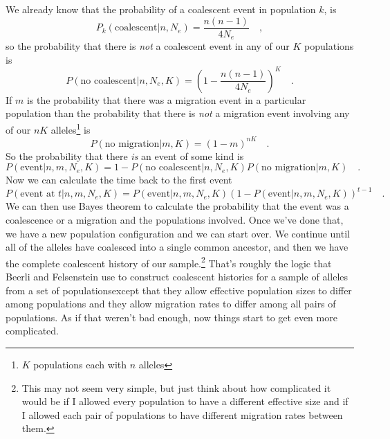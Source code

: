 \documentclass[12pt]{article}
\begin{document}
We already know that the probability of a coalescent event in
population $k$, is
\[
P_k(\mbox{coalescent}|n, N_e) = \frac{n(n-1)}{4N_e} \quad ,
\]
so the probability that there is {\it not\/} a coalescent event in any
of our $K$ populations is
\[
P(\mbox{no coalescent}|n, N_e, K) = \left(1-\frac{n(n-1)}{4N_e}\right)^K
\quad .
\]
If $m$ is the probability that there was a migration event in a
particular population than the probability that there is {\it not\/} a
migration event involving any of our $nK$ alleles\footnote{$K$ populations
each with $n$ alleles} is
\[
P(\mbox{no migration}|m, K) = (1-m)^{nK} \quad .
\]
So the probability that there {\it is\/} an event of some kind is
\[
P(\mbox{event}|n, m, N_e, K) = 1 - P(\mbox{no coalescent}|n, N_e,
K)P(\mbox{no migration}|m, K) \quad .\label{eq:event}
\]
Now we can calculate the time back to the first event
\[
P(\mbox{event at }t|n, m, N_e, K) = P(\mbox{event}|n, m, N_e,
K)\left(1 - P(\mbox{event}|n, m, N_e, K)\right)^{t-1} \quad . \label{eq:time-to-event}
\]
We can then use Bayes theorem to calculate the probability that the
event was a coalescence or a migration and the populations
involved. Once we've done that, we have a new population configuration
and we can start over. We continue until all of the alleles have
coalesced into a single common ancestor, and then we have the complete
coalescent history of our sample.\footnote{This may not seem very
  simple, but just think about how complicated it would be if I
  allowed every population to have a different effective size and if I
  allowed each pair of populations to have different migration rates
  between them.} That's roughly the logic that Beerli and Felsenstein
use to construct coalescent histories for a sample of alleles from a
set of populations{\dash}except that they allow effective population
sizes to differ among populations and they allow migration rates to
differ among all pairs of populations. As if that weren't bad enough,
now things start to get even more complicated.
\end{document}
